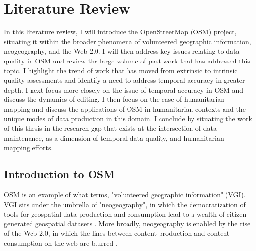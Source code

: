\chapter{Literature Review}
\label{chapterlabel2}

In this literature review, I will introduce the OpenStreetMap (OSM) project, situating it within the broader phenomena of volunteered geographic information, neogeography, and the Web 2.0. I will then address key issues relating to data quality in OSM and review the large volume of past work that has addressed this topic. I highlight the trend of work that has moved from extrinsic to intrinsic quality assessments and identify a need to address temporal accuracy in greater depth. I next focus more closely on the issue of temporal accuracy in OSM and discuss the dynamics of editing. I then focus on the case of humanitarian mapping and discuss the applications of OSM in humanitarian contexts and the unique modes of data production in this domain. I conclude by situating the work of this thesis in the research gap that exists at the intersection of data maintenance, as a dimension of temporal data quality, and humanitarian mapping efforts. 

\section{Introduction to OSM}

OSM is an example of what \textcite{goodchild_citizens_2007} terms, "volunteered geographic information" (VGI). VGI sits under the umbrella of "neogeography", in which the democratization of tools for geospatial data production and consumption lead to a wealth of citizen-generated geospatial datasets \parencite{goodchild_neogeography_2009, haklay_web_2008}. More broadly, neogeography is enabled by the rise of the Web 2.0, in which the lines between content production and content consumption on the web are blurred \parencite{oreilly_what_2009}. 

